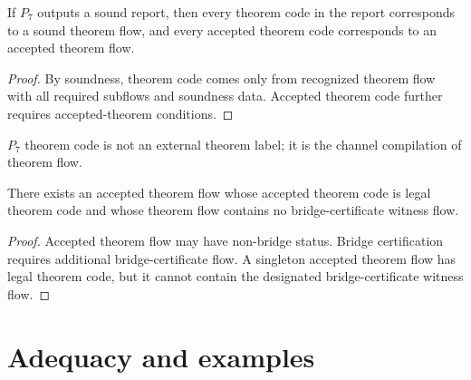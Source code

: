 \begin{theorem}
\label{thm:theorem-proof-sound-p7-report}
If $P_7$ outputs a sound report, then every theorem code in the report corresponds to a sound theorem flow, and every accepted theorem code corresponds to an accepted theorem flow.
\end{theorem}

\begin{proof}
By soundness, theorem code comes only from recognized theorem flow with all required subflows and soundness data. Accepted theorem code further requires accepted-theorem conditions.
\end{proof}

\begin{corollary}
\label{cor:theorem-proof-code-flow-mediated}
$P_7$ theorem code is not an external theorem label; it is the channel compilation of theorem flow.
\end{corollary}

\begin{theorem}
\label{thm:theorem-proof-code-not-bridge}
There exists an accepted theorem flow whose accepted theorem code is legal theorem code and whose theorem flow contains no bridge-certificate witness flow.
\end{theorem}

\begin{proof}
Accepted theorem flow may have non-bridge status. Bridge certification requires additional bridge-certificate flow. A singleton accepted theorem flow has legal theorem code, but it cannot contain the designated bridge-certificate witness flow.
\end{proof}

\section{Adequacy and examples}
\label{sec:theorem-proof-adequacy-examples}

